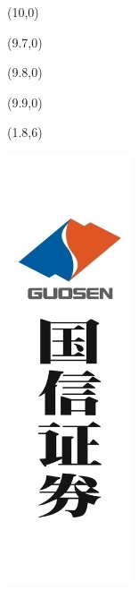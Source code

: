 \begin{titlepage}

\setlength\parindent{0pt}


\begin{textblock}{6}(10,0)
    \rule{0mm}{420mm}
\end{textblock}

\begin{textblock}{.02}(9.7,0)
    \rule{0mm}{420mm}
\end{textblock}

\begin{textblock}{.02}(9.8,0)
    \rule{0mm}{420mm}
\end{textblock}

\begin{textblock}{.02}(9.9,0)
    \rule{0mm}{420mm}
\end{textblock}

\begin{textblock}{12}(1.8,6)
\textblockcolour{}
\begin{center}
    \includegraphics[scale=1.2]{../../imgs/guosen.png}
\end{center}
\end{textblock}



\end{titlepage}
